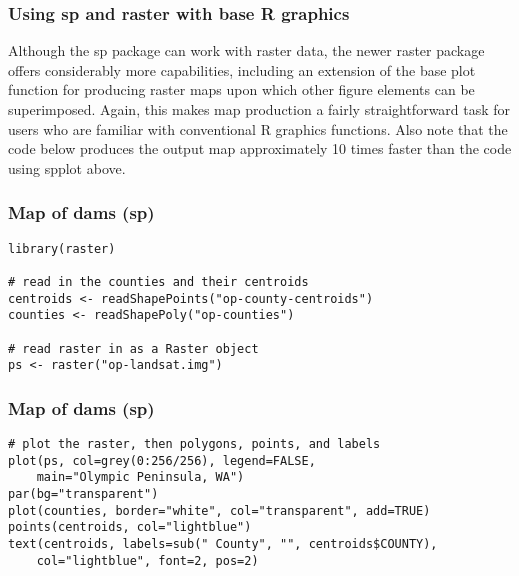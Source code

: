 \documentclass{beamer}
\begin{document}
\begin{frame}[fragile] 
\frametitle{Using sp and raster with base R graphics}
Although the sp package can work with raster data, the newer raster package offers considerably more capabilities, including an extension of the base plot function for producing raster maps upon which other figure elements can be superimposed. Again, this makes map production a fairly straightforward task for users who are familiar with conventional R graphics functions. Also note that the code below produces the output map approximately 10 times faster than the code using spplot above.
\end{frame}
\begin{frame}[fragile] 
\frametitle{Map of dams (sp)}

\begin{framed}
\begin{verbatim} 
library(raster)
 
# read in the counties and their centroids
centroids <- readShapePoints("op-county-centroids")
counties <- readShapePoly("op-counties")
 
# read raster in as a Raster object
ps <- raster("op-landsat.img")
\end{verbatim}
\end{framed}
\end{frame} 
\begin{frame}[fragile] 
\frametitle{Map of dams (sp)}

\begin{framed}
\begin{verbatim} 
# plot the raster, then polygons, points, and labels
plot(ps, col=grey(0:256/256), legend=FALSE,
    main="Olympic Peninsula, WA")
par(bg="transparent")
plot(counties, border="white", col="transparent", add=TRUE)
points(centroids, col="lightblue")
text(centroids, labels=sub(" County", "", centroids$COUNTY),
    col="lightblue", font=2, pos=2)
\end{verbatim}
\end{framed}
\end{frame}     
\end{document}
